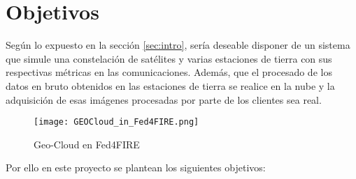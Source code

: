 
\section{Objetivos}
\label{sec:objetivos}

Según lo expuesto en la sección \ref{sec:intro}, sería deseable disponer de
un sistema que simule una constelación de satélites y varias estaciones de tierra con sus respectivas métricas en las comunicaciones. Además, que el procesado de los datos en bruto obtenidos en las estaciones de tierra se realice en la nube y la adquisición de esas imágenes procesadas por parte de los clientes sea real.

\begin{figure}
\begin{center}
\texttt{[image: GEOCloud\_in\_Fed4FIRE.png]}
\caption{Geo-Cloud en Fed4FIRE}
\end{center}
\end{figure}

Por ello en este proyecto se plantean los siguientes objetivos:

